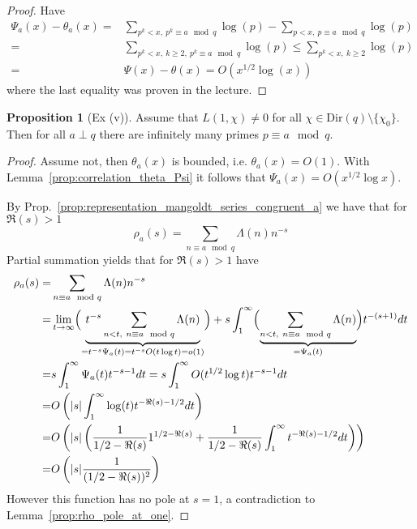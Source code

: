 \documentclass{scrartcl}
\theoremstyle{definition}
\newtheorem{proposition}[definition]{Proposition}
\begin{document}
\begin{proof}
    Have
    \begin{align*}
        \Psi_a(x) - \theta_a(x) =& \sum_{p^k < x, \ p^k \equiv a \mod q} \log(p) - \sum_{p < x, \ p \equiv a \mod q} \log(p) \\
        =& \sum_{p^k < x, \ k \geq 2, \ p^k \equiv a \mod q} \log(p) \leq \sum_{p^k < x, \ k \geq 2} \log(p) \\
        =& \Psi(x) - \theta(x) = O(x^{1/2}\log(x))
    \end{align*}
    where the last equality was proven in the lecture.
\end{proof}
\begin{proposition}[Ex (v)]
    Assume that $L(1, \chi) \neq 0$ for all $\chi \in \mathrm{Dir}(q) \setminus \{ \chi_0 \}$.
    Then for all $a \perp q$ there are infinitely many primes $p \equiv a \mod q$.
\end{proposition}
\begin{proof}
    Assume not, then $\theta_a(x)$ is bounded, i.e. $\theta_a(x) = O(1)$.
    With Lemma~\ref{prop:correlation_theta_Psi} it follows that $\Psi_a(x) = O(x^{1/2} \log x)$.

    By Prop.~\ref{prop:representation_mangoldt_series_congruent_a} we have that for $\Re(s) > 1$
    \begin{equation*}
        \rho_a(s) = \sum_{n \equiv a \mod q} \Lambda(n) n^{-s}
    \end{equation*}
    Partial summation yields that for $\Re(s) > 1$ have
    \begin{align*}
        \rho_a(s) =& \sum_{n \equiv a \mod q} \Lambda(n) n^{-s} \\
        =& \lim_{t \to \infty} \Bigl( \underbrace{ t^{-s} \sum_{n < t, \ n \equiv a \mod q} \Lambda(n) }_{ = t^{-s} \Psi_a(t) = t^{-s} O(t\log t) = o(1)} \Bigr) 
        + s \int_1^\infty \Bigl( \underbrace{\sum_{n < t, \ n \equiv a \mod q} \Lambda(n) }_{ = \Psi_a(t)} \Bigr) t^{-(s + 1)} dt \\
        =& s \int_1^\infty \Psi_a(t) t^{-s - 1} dt = s \int_1^\infty O(t^{1/2}\log t) t^{-s - 1} dt \\
        =& O\left( |s| \int_1^\infty \log(t) t^{-\Re(s) - 1/2} dt \right) \\
        =& O\left( |s| \left( \frac 1 {1/2 - \Re(s)} 1^{1/2 - \Re(s)} + \frac 1 {1/2 - \Re(s)} \int_1^\infty t^{-\Re(s) - 1/2} dt \right) \right) \\
        =& O\left( |s| \frac 1 {(1/2 - \Re(s))^2} \right)
    \end{align*}
    However this function has no pole at $s = 1$, a contradiction to Lemma~\ref{prop:rho_pole_at_one}.
\end{proof}
\end{document}
